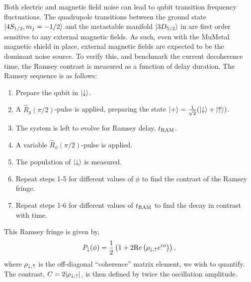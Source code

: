    Both electric and magnetic field noise can lead to qubit transition frequency fluctuations.
    The quadrupole transitions between the ground state $\ket{4S_{1/2}, m_j=-1/2}$ and the metastable manifold $\ket{3D_{5/2}}$ in \ca are first order sensitive to any external magnetic fields. As such, even with the MuMetal magnetic shield in place, external magnetic fields are expected to be the dominant noise source. To verify this, and benchmark the current decoherence time, the Ramsey contrast is measured as a function of delay duration. 
    The Ramsey sequence is as follows:
    \begin{enumerate}
        \item Prepare the qubit in $\ket{\downarrow}$. 
        \item A $\hat R_y(\pi/2)$-pulse is applied, preparing the state $\ket{+} = \frac{1}{\sqrt{2}}(\ket{\downarrow} + \ket{\uparrow})$.
        \item The system is left to evolve for Ramsey delay, $t_{\rm RAM}$.
        \item A variable $\hat R_\phi(\pi/2)$-pulse is applied.
        \item The population of $\ket{\downarrow}$ is measured.
        \item Repeat steps 1-5 for different values of $\phi$ to find the contrast of the Ramsey fringe.
        \item Repeat steps 1-6 for different values of $t_{\rm RAM}$ to find the decay in contrast with time. 
    \end{enumerate}
    This Ramsey fringe is given by,
    \begin{equation}
    P_\downarrow(\phi)=\frac{1}{2}\left(1+2\mathrm{Re}\left(\rho_{\downarrow,\uparrow}e^{i\phi}\right)\right),
    \end{equation}
    where $\rho_{\downarrow,\uparrow}$ is the off-diagonal ``coherence'' matrix element, we wish to quantify. The contrast, $C=2|\rho_{\downarrow,\uparrow}|$, is then defined by twice the oscillation amplitude.

